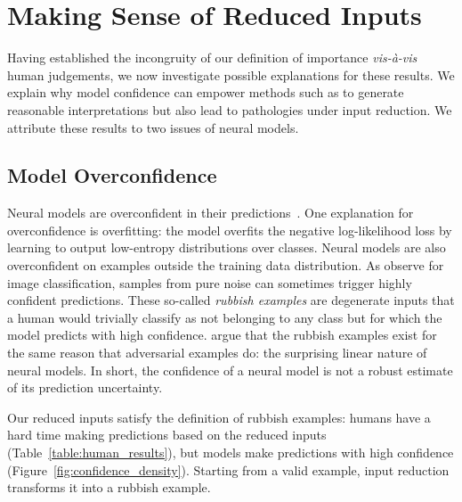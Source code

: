 \section{Making Sense of Reduced Inputs}
\label{sec:confidence}

Having established the incongruity of our definition of importance
\textit{vis-\`a-vis}
human judgements, we now investigate possible explanations for these results.
We explain why model confidence can empower methods such as \loo{} to
generate reasonable interpretations but also lead to
pathologies under input reduction. We attribute these results to two
issues of neural models.

\subsection{Model Overconfidence}
\label{sec:overconfidence}

Neural models are overconfident in their
predictions~\cite{guo2017calibration}.  One explanation for
overconfidence is overfitting: the model overfits the negative
log-likelihood loss by learning to output low-entropy distributions
over classes.  Neural models are also overconfident on examples
outside the training data distribution.  As
\citet{goodfellow2014explaining} observe for image classification,
samples from pure noise can sometimes trigger highly confident
predictions. These so-called \emph{rubbish examples} are degenerate
inputs that a human would trivially classify as not belonging to any
class but for which the model predicts with high confidence.
\citet{goodfellow2014explaining} argue that the rubbish examples exist
for the same reason that adversarial examples do: the surprising
linear nature of neural models. In short, the confidence of a neural
model is not a robust estimate of its prediction uncertainty.

Our reduced inputs satisfy the definition of rubbish examples: humans have a
hard time making predictions based on the reduced inputs
(Table~\ref{table:human_results}), but models make predictions with high
confidence (Figure~\ref{fig:confidence_density}). Starting from a valid example,
input reduction transforms it into a rubbish example.


